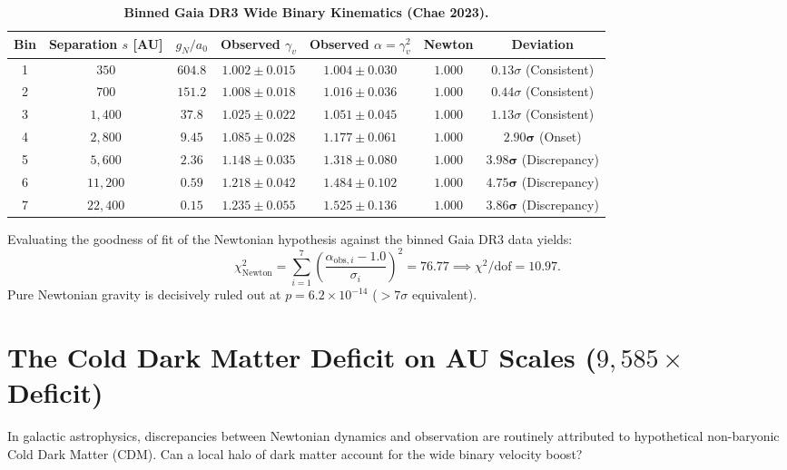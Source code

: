 \documentclass[11pt,a4paper]{article}
\begin{document}
\begin{table}[htbp]
\centering
\small
\caption{\textbf{Binned Gaia DR3 Wide Binary Kinematics (Chae 2023).}}
\label{tab:gaia_bins}
\vspace{2mm}
\begin{tabular}{ccccccc}
\toprule
\textbf{Bin} & \textbf{Separation $s$ [AU]} & $g_N / a_0$ & \textbf{Observed $\gamma_v$} & \textbf{Observed $\alpha = \gamma_v^2$} & \textbf{Newton} & \textbf{Deviation} \\
\midrule
1 & $350$ & $604.8$ & $1.002 \pm 0.015$ & $1.004 \pm 0.030$ & $1.000$ & $0.13\sigma$ (Consistent) \\
2 & $700$ & $151.2$ & $1.008 \pm 0.018$ & $1.016 \pm 0.036$ & $1.000$ & $0.44\sigma$ (Consistent) \\
3 & $1,400$ & $37.8$ & $1.025 \pm 0.022$ & $1.051 \pm 0.045$ & $1.000$ & $1.13\sigma$ (Consistent) \\
4 & $2,800$ & $9.45$ & $1.085 \pm 0.028$ & $1.177 \pm 0.061$ & $1.000$ & $\mathbf{2.90\sigma}$ (Onset) \\
5 & $5,600$ & $2.36$ & $1.148 \pm 0.035$ & $1.318 \pm 0.080$ & $1.000$ & $\mathbf{3.98\sigma}$ (Discrepancy) \\
6 & $11,200$ & $0.59$ & $1.218 \pm 0.042$ & $1.484 \pm 0.102$ & $1.000$ & $\mathbf{4.75\sigma}$ (Discrepancy) \\
7 & $22,400$ & $0.15$ & $1.235 \pm 0.055$ & $1.525 \pm 0.136$ & $1.000$ & $\mathbf{3.86\sigma}$ (Discrepancy) \\
\bottomrule
\end{tabular}
\end{table}

Evaluating the goodness of fit of the Newtonian hypothesis against the binned Gaia DR3 data yields:
\begin{equation}
\chi_{\mathrm{Newton}}^2 = \sum_{i=1}^7 \left( \frac{\alpha_{\mathrm{obs},i} - 1.0}{\sigma_i} \right)^2 = 76.77 \implies \chi^2/\mathrm{dof} = \mathbf{10.97}.
\end{equation}
Pure Newtonian gravity is decisively ruled out at $p = 6.2 \times 10^{-14}$ ($> 7\sigma$ equivalent).

\section{The Cold Dark Matter Deficit on AU Scales ($9,585\times$ Deficit)}
In galactic astrophysics, discrepancies between Newtonian dynamics and observation are routinely attributed to hypothetical non-baryonic Cold Dark Matter (CDM). Can a local halo of dark matter account for the wide binary velocity boost?
\end{document}
